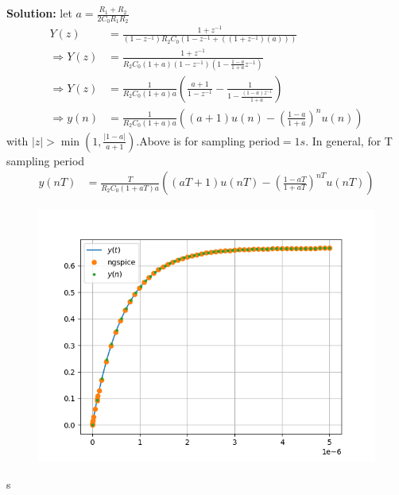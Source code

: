 \documentclass[journal,12pt,twocolumn]{IEEEtran}
\newcommand{\solution}{\noindent \textbf{Solution: }}
\providecommand{\brak}[1]{\ensuremath{\left(#1\right)}}
\numberwithin{equation}{section}
\renewcommand\thesection{\arabic{section}}
\begin{document}
\begin{enumerate}[label=\arabic*.,ref=\thesection.\theenumi]
 \solution
 let $a=\frac{R_1+R_2}{2C_0R_1R_2 }$
 \begin{align}
  Y(z)&=\frac{1+z^{-1}}{(1-z^{-1})R_2C_0\brak{1-z^{-1}+\brak{(1+z^{-1})\brak{a}}}}\\
  \Rightarrow Y(z)&=\frac{1+z^{-1}}{R_2C_0(1+a)(1-z^{-1})\brak{1-\frac{1-a}{1+a}z^{-1}}}\\
  \Rightarrow Y(z)&=\frac{1}{R_2C_0(1+a)a}\brak{\frac{a+1}{1-z^{-1}}-\frac{1}{1-\frac{(1-a)z^{-1}}{1+a}}}\\
  \Rightarrow y(n )&=\frac{1}{R_2C_0(1+a)a}\brak{(a+1)u(n )-\brak{\frac{1-a}{1+a}}^{n}u(n )}
 \end{align}
 with $|z|>\min{(1,\frac{|1-a|}{a+1})}$.Above is for sampling period$=1s$.
 In general, for T sampling period
 \begin{align}
  y(nT)&=\frac{T}{R_2C_0(1+aT)a}\brak{(aT+1)u(nT)-\brak{\frac{1-aT}{1+aT}}^{nT}u(nT)}
 \end{align}
 \begin{figure}[!ht]
  \begin{center}
  \includegraphics[width=\columnwidth]{./figs/4.7.png}
  \end{center}
  \label{fig:xnyn}
  \end{figure}s	
	\end{enumerate}
\end{document}

